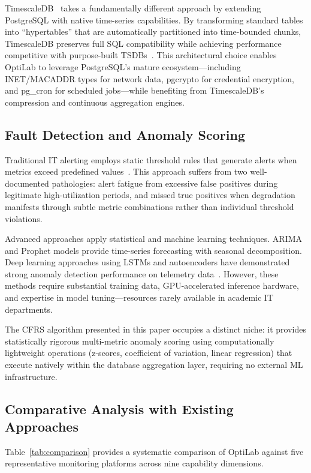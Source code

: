 \documentclass{ieeeaccess}
\begin{document}
TimescaleDB~\cite{timescaledb} takes a fundamentally different approach by extending PostgreSQL with native time-series capabilities. By transforming standard tables into ``hypertables'' that are automatically partitioned into time-bounded chunks, TimescaleDB preserves full SQL compatibility while achieving performance competitive with purpose-built TSDBs~\cite{database_performance}. This architectural choice enables OptiLab to leverage PostgreSQL's mature ecosystem---including INET/MACADDR types for network data, pgcrypto for credential encryption, and pg\_cron for scheduled jobs---while benefiting from TimescaleDB's compression and continuous aggregation engines.

\subsection{Fault Detection and Anomaly Scoring}
Traditional IT alerting employs static threshold rules that generate alerts when metrics exceed predefined values~\cite{alert_systems}. This approach suffers from two well-documented pathologies: alert fatigue from excessive false positives during legitimate high-utilization periods, and missed true positives when degradation manifests through subtle metric combinations rather than individual threshold violations.

Advanced approaches apply statistical and machine learning techniques. ARIMA and Prophet models provide time-series forecasting with seasonal decomposition. Deep learning approaches using LSTMs and autoencoders have demonstrated strong anomaly detection performance on telemetry data~\cite{anomaly_detection}. However, these methods require substantial training data, GPU-accelerated inference hardware, and expertise in model tuning---resources rarely available in academic IT departments.

The CFRS algorithm presented in this paper occupies a distinct niche: it provides statistically rigorous multi-metric anomaly scoring using computationally lightweight operations (z-scores, coefficient of variation, linear regression) that execute natively within the database aggregation layer, requiring no external ML infrastructure.

\subsection{Comparative Analysis with Existing Approaches}
Table~\ref{tab:comparison} provides a systematic comparison of OptiLab against five representative monitoring platforms across nine capability dimensions.
\end{document}
